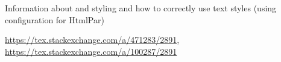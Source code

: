 Information about \texcommand{\NewConfigureOO} and styling and how to correctly use text styles (using configuration for HtmlPar)

\url{https://tex.stackexchange.com/a/471283/2891}, \url{https://tex.stackexchange.com/a/100287/2891}
